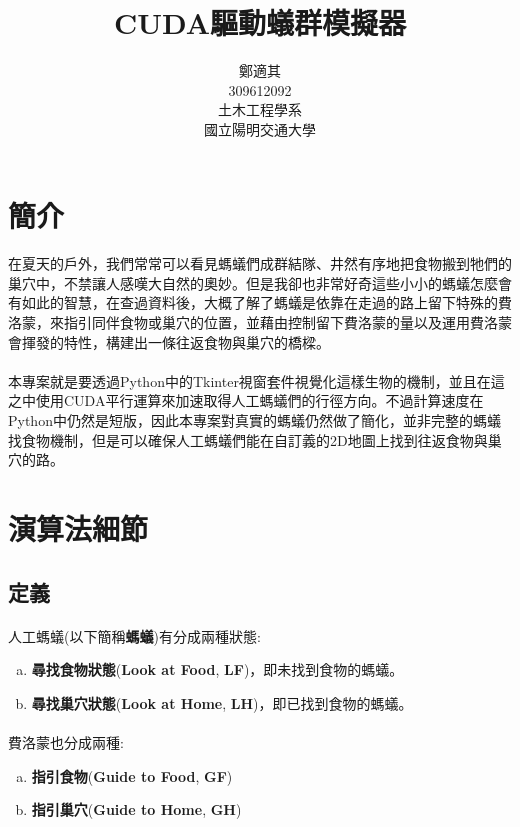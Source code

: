 \documentclass[]{article}
\title{CUDA驅動蟻群模擬器}
\author{
	鄭適其\\
	309612092 \\
	土木工程學系\\
	國立陽明交通大學 \\
}
\begin{document}
\maketitle
\tableofcontents

\clearpage
\section{簡介}
\label{intro}
\paragraph{}
在夏天的戶外，我們常常可以看見螞蟻們成群結隊、井然有序地把食物搬到牠們的巢穴中，不禁讓人感嘆大自然的奧妙。但是我卻也非常好奇這些小小的螞蟻怎麼會有如此的智慧，在查過資料後，大概了解了螞蟻是依靠在走過的路上留下特殊的費洛蒙，來指引同伴食物或巢穴的位置，並藉由控制留下費洛蒙的量以及運用費洛蒙會揮發的特性，構建出一條往返食物與巢穴的橋樑。
\paragraph{}
本專案就是要透過Python中的Tkinter視窗套件視覺化這樣生物的機制，並且在這之中使用CUDA平行運算來加速取得人工螞蟻們的行徑方向。不過計算速度在Python中仍然是短版，因此本專案對真實的螞蟻仍然做了簡化，並非完整的螞蟻找食物機制，但是可以確保人工螞蟻們能在自訂義的2D地圖上找到往返食物與巢穴的路。


\section{演算法細節}
\label{algo}

\subsection{定義}
\label{algo:cls}
\paragraph{}
人工螞蟻(以下簡稱\textbf{螞蟻})有分成兩種狀態:
\begin{enumerate}[(a)]
	\item \textbf{尋找食物狀態}(\textbf{Look at Food}, \textbf{LF})，即未找到食物的螞蟻。
	\item \textbf{尋找巢穴狀態}(\textbf{Look at Home}, \textbf{LH})，即已找到食物的螞蟻。
\end{enumerate}
\paragraph{}
費洛蒙也分成兩種:
\begin{enumerate}[(a)]
	\item \textbf{指引食物}(\textbf{Guide to Food}, \textbf{GF})
	\item \textbf{指引巢穴}(\textbf{Guide to Home}, \textbf{GH})
\end{enumerate}
\end{document}
